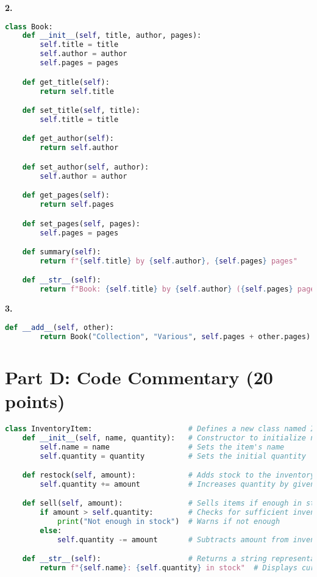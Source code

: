\documentclass[11pt]{article}
\begin{document}
\vspace{0.5cm}
\textbf{2.}
\begin{lstlisting}[language=Python]
class Book:
    def __init__(self, title, author, pages):
        self.title = title
        self.author = author
        self.pages = pages

    def get_title(self):
        return self.title

    def set_title(self, title):
        self.title = title

    def get_author(self):
        return self.author

    def set_author(self, author):
        self.author = author

    def get_pages(self):
        return self.pages

    def set_pages(self, pages):
        self.pages = pages

    def summary(self):
        return f"{self.title} by {self.author}, {self.pages} pages"

    def __str__(self):
        return f"Book: {self.title} by {self.author} ({self.pages} pages)"
\end{lstlisting}

\vspace{0.5cm}
\textbf{3.}
\begin{lstlisting}[language=Python]
    def __add__(self, other):
        return Book("Collection", "Various", self.pages + other.pages)
\end{lstlisting}

\section*{Part D: Code Commentary (20 points)}

\begin{lstlisting}[language=Python]
class InventoryItem:                      # Defines a new class named InventoryItem
    def __init__(self, name, quantity):   # Constructor to initialize name and quantity
        self.name = name                  # Sets the item's name
        self.quantity = quantity          # Sets the initial quantity

    def restock(self, amount):            # Adds stock to the inventory
        self.quantity += amount           # Increases quantity by given amount

    def sell(self, amount):               # Sells items if enough in stock
        if amount > self.quantity:        # Checks for sufficient inventory
            print("Not enough in stock")  # Warns if not enough
        else:
            self.quantity -= amount       # Subtracts amount from inventory

    def __str__(self):                    # Returns a string representation
        return f"{self.name}: {self.quantity} in stock"  # Displays current stock info
\end{lstlisting}
\end{document}
